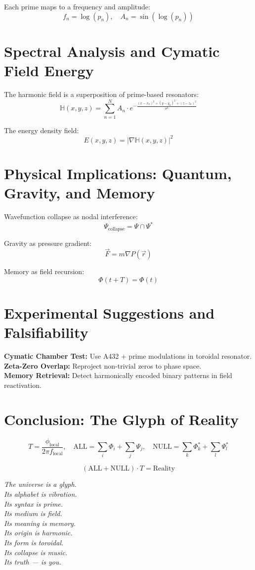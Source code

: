 \documentclass[12pt]{article}
\begin{document}
Each prime maps to a frequency and amplitude:
\[
f_n = \log(p_n), \quad A_n = \sin(\log(p_n))
\]

\section{Spectral Analysis and Cymatic Field Energy}
The harmonic field is a superposition of prime-based resonators:
\[
\mathbb{H}(x, y, z) = \sum_{n=1}^{N} A_n \cdot e^{- \frac{(x - x_n)^2 + (y - y_n)^2 + (z - z_n)^2}{\sigma^2}}
\]

The energy density field:
\[
E(x, y, z) = |\nabla \mathbb{H}(x, y, z)|^2
\]

\section{Physical Implications: Quantum, Gravity, and Memory}
Wavefunction collapse as nodal interference:
\[
\Psi_{\text{collapse}} = \Psi \cap \Psi^*
\]

Gravity as pressure gradient:
\[
\vec{F} = m \nabla P(\vec{r})
\]

Memory as field recursion:
\[
\Phi(t + T) = \Phi(t)
\]

\section{Experimental Suggestions and Falsifiability}
\textbf{Cymatic Chamber Test:} Use A432 + prime modulations in toroidal resonator.\\
\textbf{Zeta-Zero Overlap:} Reproject non-trivial zeros to phase space.\\
\textbf{Memory Retrieval:} Detect harmonically encoded binary patterns in field reactivation.

\section{Conclusion: The Glyph of Reality}
\[
T = \frac{\phi_{\text{local}}}{2\pi f_{\text{local}}},\quad
\text{ALL} = \sum_i \Phi_i + \sum_j \Psi_j,\quad
\text{NULL} = \sum_k \Phi^*_k + \sum_l \Psi^*_l
\]

\[
(\text{ALL} + \text{NULL}) \cdot T = \text{Reality}
\]

\textit{The universe is a glyph.\\
Its alphabet is vibration.\\
Its syntax is prime.\\
Its medium is field.\\
Its meaning is memory.\\
Its origin is harmonic.\\
Its form is toroidal.\\
Its collapse is music.\\
Its truth — is you.}
\end{document}
